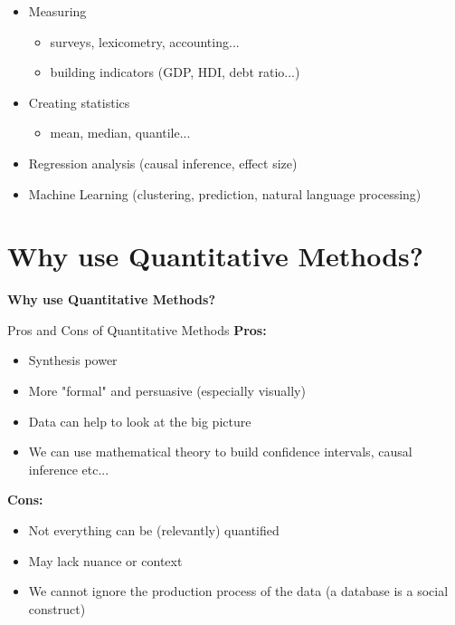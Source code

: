 \documentclass{beamer}
\begin{document}
\begin{frame}
    \begin{itemize}
        \item Measuring
        \begin{itemize}
            \item surveys, lexicometry, accounting...
            \item building indicators (GDP, HDI, debt ratio...)
        \end{itemize}
        \vspace{0.2cm}
        \item Creating statistics
        \begin{itemize}
            \item mean, median, quantile...
        \end{itemize}
        \vspace{0.2cm}
        \item Regression analysis (causal inference, effect size)
        \vspace{0.2cm}
        \item Machine Learning (clustering, prediction, natural language processing)
    \end{itemize}
\end{frame}

\section{Why use Quantitative Methods?}
\begin{frame}[plain]
    \centering \Large
    \textbf{Why use Quantitative Methods?}
\end{frame}

\begin{frame}{Pros and Cons of Quantitative Methods}
    \textbf{Pros:}
    \begin{itemize}
        \item Synthesis power
        \item More "formal" and persuasive (especially visually)
        \item Data can help to look at the big picture
        \item We can use mathematical theory to build  confidence intervals, causal inference etc...
    \end{itemize}
    \vspace{0.2cm}
    \textbf{Cons:}
    \begin{itemize}
        \item Not everything can be (relevantly) quantified
        \item May lack nuance or context
        \item We cannot ignore the production process of the data (a database is a social construct)
    \end{itemize}
\end{frame}
\end{document}
